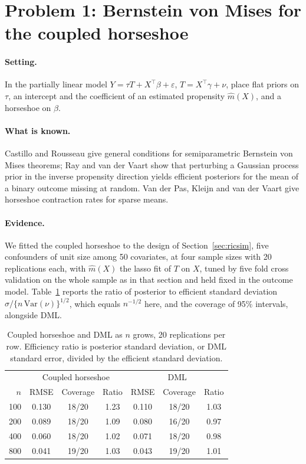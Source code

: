 \section{Problem 1: Bernstein von Mises for the coupled horseshoe}

\paragraph{Setting.} In the partially linear model $Y = \tau T + X^\top\beta + \varepsilon$, $T = X^\top\gamma + \nu$, place flat priors on $\tau$, an intercept and the coefficient of an estimated propensity $\hat m(X)$, and a horseshoe on $\beta$.

\paragraph{What is known.} Castillo and Rousseau give general conditions for semiparametric Bernstein von Mises theorems; Ray and van der Vaart show that perturbing a Gaussian process prior in the inverse propensity direction yields efficient posteriors for the mean of a binary outcome missing at random. Van der Pas, Kleijn and van der Vaart give horseshoe contraction rates for sparse means.

\paragraph{Evidence.} We fitted the coupled horseshoe to the design of Section~\ref{sec:ricsim}, five confounders of unit size among 50 covariates, at four sample sizes with 20 replications each, with $\hat m(X)$ the lasso fit of $T$ on $X$, tuned by five fold cross validation on the whole sample as in that section and held fixed in the outcome model. Table~\ref{tab:open1} reports the ratio of posterior to efficient standard deviation $\sigma/\{n\,\mathrm{Var}(\nu)\}^{1/2}$, which equals $n^{-1/2}$ here, and the coverage of 95\% intervals, alongside DML.

\begin{table}[ht]
\centering
\caption{Coupled horseshoe and DML as $n$ grows, 20 replications per row. Efficiency ratio is posterior standard deviation, or DML standard error, divided by the efficient standard deviation.}
\label{tab:open1}
\small
\begin{tabular}{rcccccc}
\toprule
& \multicolumn{3}{c}{Coupled horseshoe} & \multicolumn{3}{c}{DML} \\
$n$ & RMSE & Coverage & Ratio & RMSE & Coverage & Ratio \\
\midrule
100 & 0.130 & 18/20 & 1.23 & 0.110 & 18/20 & 1.03 \\
200 & 0.089 & 18/20 & 1.09 & 0.080 & 16/20 & 0.97 \\
400 & 0.060 & 18/20 & 1.02 & 0.071 & 18/20 & 0.98 \\
800 & 0.041 & 19/20 & 1.03 & 0.043 & 19/20 & 1.01 \\
\bottomrule
\end{tabular}
\end{table}

